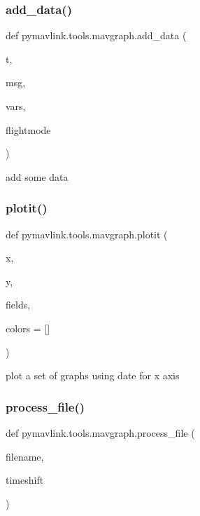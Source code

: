\subsubsection{\texorpdfstring{add\+\_\+data()}{add\_data()}}
{\footnotesize\ttfamily def pymavlink.\+tools.\+mavgraph.\+add\+\_\+data (\begin{DoxyParamCaption}\item[{}]{t,  }\item[{}]{msg,  }\item[{}]{vars,  }\item[{}]{flightmode }\end{DoxyParamCaption})}

\begin{DoxyVerb}add some data\end{DoxyVerb}
 \mbox{\label{namespacepymavlink_1_1tools_1_1mavgraph_ac4c25ed1ed8661bb69619e15992c1c81}} 
\subsubsection{\texorpdfstring{plotit()}{plotit()}}
{\footnotesize\ttfamily def pymavlink.\+tools.\+mavgraph.\+plotit (\begin{DoxyParamCaption}\item[{}]{x,  }\item[{}]{y,  }\item[{}]{fields,  }\item[{}]{colors = {\ttfamily \mbox{[}\mbox{]}} }\end{DoxyParamCaption})}

\begin{DoxyVerb}plot a set of graphs using date for x axis\end{DoxyVerb}
 \mbox{\label{namespacepymavlink_1_1tools_1_1mavgraph_a47959158ff9478cba6dd7fb7000655ea}} 
\subsubsection{\texorpdfstring{process\+\_\+file()}{process\_file()}}
{\footnotesize\ttfamily def pymavlink.\+tools.\+mavgraph.\+process\+\_\+file (\begin{DoxyParamCaption}\item[{}]{filename,  }\item[{}]{timeshift }\end{DoxyParamCaption})}

